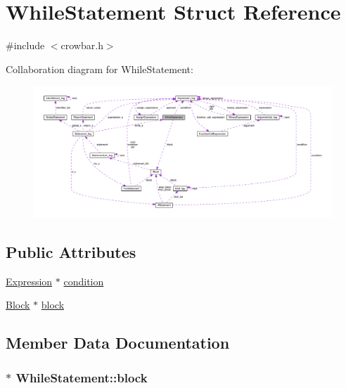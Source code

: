 \hypertarget{struct_while_statement}{}\section{While\+Statement Struct Reference}
\label{struct_while_statement}


{\ttfamily \#include $<$crowbar.\+h$>$}



Collaboration diagram for While\+Statement\+:\nopagebreak
\begin{figure}[H]
\begin{center}
\leavevmode
\includegraphics[width=350pt]{struct_while_statement__coll__graph}
\end{center}
\end{figure}
\subsection*{Public Attributes}
\begin{DoxyCompactItemize}
\item 
\hyperlink{crowbar_8h_a070c6feb370aad8a9665ca315bf6ed4a}{Expression} $\ast$ \hyperlink{struct_while_statement_af0f54d7883033e8be83f790afefbae75}{condition}
\item 
\hyperlink{struct_block}{Block} $\ast$ \hyperlink{struct_while_statement_a3cb552a56e39942279e23c2d75df37f4}{block}
\end{DoxyCompactItemize}


\subsection{Member Data Documentation}
\hypertarget{struct_while_statement_a3cb552a56e39942279e23c2d75df37f4}{}
\subsubsection[{block}]{$\ast$ While\+Statement\+::block}\label{struct_while_statement_a3cb552a56e39942279e23c2d75df37f4}
\hypertarget{struct_while_statement_af0f54d7883033e8be83f790afefbae75}{}
